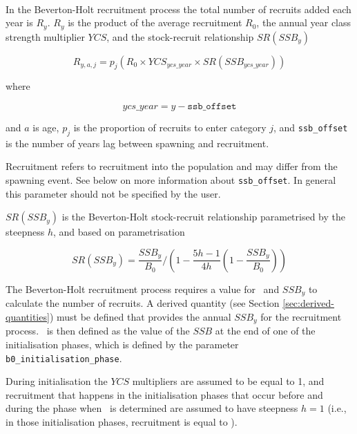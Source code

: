 \paragraph{}\label{subsubsec:BH-recruitment}

In the Beverton-Holt recruitment process the total number of recruits added each year is $R_y$. $R_y$ is the product of the average recruitment $R_0$, the annual year class strength multiplier $YCS$, and the stock-recruit relationship $SR(SSB_y)$

\begin{equation}\label{eq:BH}
  R_{y,a,j} = p_j(R_0 \times YCS_{ycs\_year} \times SR(SSB_{ycs\_year}))
\end{equation}

where

\begin{equation}\label{eq:year_class}
ycs\_year = y - \texttt{ssb\_offset}
\end{equation}

and $a$ is age, $p_j$ is the proportion of recruits to enter category $j$, and \texttt{ssb\_offset} is the number of years lag between spawning and recruitment.

Recruitment refers to recruitment into the population and may differ from the spawning event. See below on more information about \texttt{ssb\_offset}. In general this parameter should not be specified by the user.

$SR(SSB_y)$ is the Beverton-Holt stock-recruit relationship parametrised by the steepness $h$, and based on \cite{mace_doonan_88} parametrisation

\begin{equation}\label{eq:BH_SR}
SR(SSB_y) = \frac{SSB_y}{B_0} / \left( 1-\frac{5h-1}{4h} \left( 1-\frac{SSB_y}{B_0} \right) \right)
\end{equation}

The Beverton-Holt recruitment process requires a value for \Bzero\ and $SSB_y$ to calculate the number of recruits. A derived quantity (see Section \ref{sec:derived-quantities}) must be defined that provides the annual $SSB_y$ for the recruitment process. \Bzero\ is then defined as the value of the $SSB$ at the end of one of the initialisation phases, which is defined by the parameter \texttt{b0\_initialisation\_phase}.

During initialisation the $YCS$ multipliers are assumed to be equal to 1, and recruitment that happens in the initialisation phases that occur before and during the phase when \Bzero\ is determined are assumed to have steepness $h=1$ (i.e., in those initialisation phases, recruitment is equal to \Rzero).

